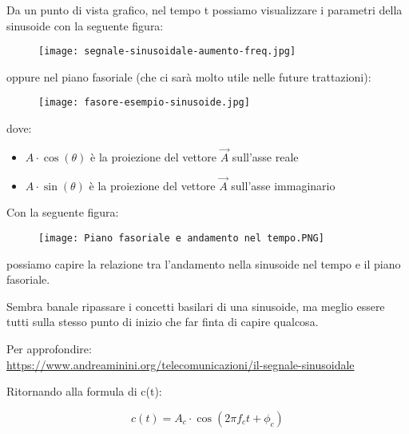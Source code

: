 Da un punto di vista grafico, nel tempo t possiamo visualizzare i parametri della sinusoide con la seguente figura: 

\begin{figure}[h]
    \centering
    \texttt{[image: segnale-sinusoidale-aumento-freq.jpg]}
\end{figure}

oppure nel piano fasoriale (che ci sarà molto utile nelle future trattazioni): 

\begin{figure}[h]
    \centering
    \texttt{[image: fasore-esempio-sinusoide.jpg]}
\end{figure}

dove: 

\begin{itemize}
    \item $A \cdot \cos(\theta)$ è la proiezione del vettore $\overrightarrow{A}$ sull'asse reale 
    \item $A \cdot \sin(\theta)$ è la proiezione del vettore $\overrightarrow{A}$ sull'asse immaginario 
\end{itemize}

\newpage

Con la seguente figura: 

\begin{figure}[h]
    \centering
    \texttt{[image: Piano fasoriale e andamento nel tempo.PNG]}
\end{figure}

possiamo capire la relazione tra l'andamento nella sinusoide nel tempo e il piano fasoriale. \newline 

\begin{tcolorbox}
    Sembra banale ripassare i concetti basilari di una sinusoide, ma meglio essere tutti sulla stesso punto di inizio che far finta di capire qualcosa. \newline 
    
    Per approfondire: \\
    \url{https://www.andreaminini.org/telecomunicazioni/il-segnale-sinusoidale}
\end{tcolorbox}

Ritornando alla formula di c(t): 

{
    \Large 
    \begin{equation}
        c(t) = A_c \cdot \cos(2 \pi f_c t + \phi_c)
    \end{equation}
}

